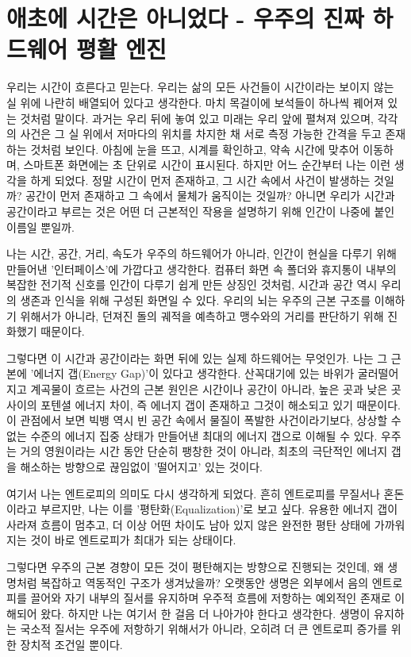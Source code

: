 

\section{애초에 시간은 아니었다 - 우주의 진짜 하드웨어 평활 엔진}
우리는 시간이 흐른다고 믿는다. 우리는 삶의 모든 사건들이 시간이라는 보이지 않는 실 위에 나란히 배열되어 있다고 생각한다. 마치 목걸이에 보석들이 하나씩 꿰어져 있는 것처럼 말이다. 과거는 우리 뒤에 놓여 있고 미래는 우리 앞에 펼쳐져 있으며, 각각의 사건은 그 실 위에서 저마다의 위치를 차지한 채 서로 측정 가능한 간격을 두고 존재하는 것처럼 보인다. 아침에 눈을 뜨고, 시계를 확인하고, 약속 시간에 맞추어 이동하며, 스마트폰 화면에는 초 단위로 시간이 표시된다. 하지만 어느 순간부터 나는 이런 생각을 하게 되었다. 정말 시간이 먼저 존재하고, 그 시간 속에서 사건이 발생하는 것일까? 공간이 먼저 존재하고 그 속에서 물체가 움직이는 것일까? 아니면 우리가 시간과 공간이라고 부르는 것은 어떤 더 근본적인 작용을 설명하기 위해 인간이 나중에 붙인 이름일 뿐일까.

나는 시간, 공간, 거리, 속도가 우주의 하드웨어가 아니라, 인간이 현실을 다루기 위해 만들어낸 '인터페이스'에 가깝다고 생각한다. 컴퓨터 화면 속 폴더와 휴지통이 내부의 복잡한 전기적 신호를 인간이 다루기 쉽게 만든 상징인 것처럼, 시간과 공간 역시 우리의 생존과 인식을 위해 구성된 화면일 수 있다. 우리의 뇌는 우주의 근본 구조를 이해하기 위해서가 아니라, 던져진 돌의 궤적을 예측하고 맹수와의 거리를 판단하기 위해 진화했기 때문이다.

그렇다면 이 시간과 공간이라는 화면 뒤에 있는 실제 하드웨어는 무엇인가. 나는 그 근본에 '에너지 갭(Energy Gap)'이 있다고 생각한다. 산꼭대기에 있는 바위가 굴러떨어지고 계곡물이 흐르는 사건의 근본 원인은 시간이나 공간이 아니라, 높은 곳과 낮은 곳 사이의 포텐셜 에너지 차이, 즉 에너지 갭이 존재하고 그것이 해소되고 있기 때문이다. 이 관점에서 보면 빅뱅 역시 빈 공간 속에서 물질이 폭발한 사건이라기보다, 상상할 수 없는 수준의 에너지 집중 상태가 만들어낸 최대의 에너지 갭으로 이해될 수 있다. 우주는 거의 영원이라는 시간 동안 단순히 팽창한 것이 아니라, 최초의 극단적인 에너지 갭을 해소하는 방향으로 끊임없이 '떨어지고' 있는 것이다.

여기서 나는 엔트로피의 의미도 다시 생각하게 되었다. 흔히 엔트로피를 무질서나 혼돈이라고 부르지만, 나는 이를 '평탄화(Equalization)'로 보고 싶다. 유용한 에너지 갭이 사라져 흐름이 멈추고, 더 이상 어떤 차이도 남아 있지 않은 완전한 평탄 상태에 가까워지는 것이 바로 엔트로피가 최대가 되는 상태이다.

그렇다면 우주의 근본 경향이 모든 것이 평탄해지는 방향으로 진행되는 것인데, 왜 생명처럼 복잡하고 역동적인 구조가 생겨났을까? 오랫동안 생명은 외부에서 음의 엔트로피를 끌어와 자기 내부의 질서를 유지하며 우주적 흐름에 저항하는 예외적인 존재로 이해되어 왔다. 하지만 나는 여기서 한 걸음 더 나아가야 한다고 생각한다. 생명이 유지하는 국소적 질서는 우주에 저항하기 위해서가 아니라, 오히려 더 큰 엔트로피 증가를 위한 장치적 조건일 뿐이다.

